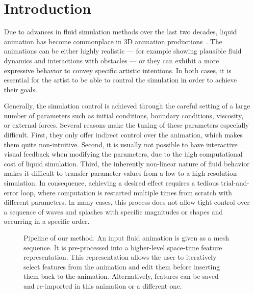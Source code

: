 \documentclass[review]{acmsiggraph}
\begin{document}
\keywordlist

\conceptlist

\printcopyright

\section{Introduction} \label{sec:introduction}

Due to advances in fluid simulation methods over the last two decades, liquid animation has become commonplace in 3D animation productions~\cite{VanOpstal2014,Reisch2016}. 
The animations can be either highly realistic --- for example showing plausible fluid dynamics and interactions with obstacles --- or they can exhibit a more expressive behavior to convey specific artistic intentions. In both cases, it is essential for the artist to be able to control the simulation in order to achieve their goals.

Generally, the simulation control is achieved through the careful setting of a large number of parameters such as initial conditions, boundary conditions, viscosity, or external forces. 
Several reasons make the tuning of these parameters especially difficult. 
First, they only offer indirect control over the animation, which makes them quite non-intuitive. 
Second, it is usually not possible to have interactive visual feedback when modifying the parameters, due to the high computational cost of 
liquid simulation.
Third, the inherently non-linear nature of fluid behavior makes it difficult to transfer parameter values from a low to a high resolution simulation. 
In consequence, achieving a desired effect requires a tedious trial-and-error loop, where computation is restarted multiple times from scratch with different parameters. 
In many cases, this process does not allow tight control over a sequence of waves and splashes with specific magnitudes or shapes and occurring in a specific order. 
\begin{figure}[htp!]
\centering

\caption{
Pipeline of our method: 
An input fluid animation is given as a mesh sequence. 
It is pre-processed into a higher-level space-time feature representation. 
This representation allows the user to iteratively select features from the animation and edit them before inserting them back to the animation. 
Alternatively, features can be saved and re-imported in this animation or a different one. }
\label{fig:overview}
\end{figure}
\end{document}
